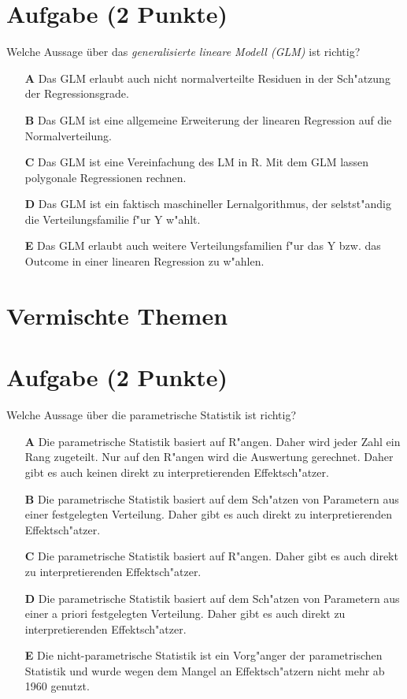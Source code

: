 \documentclass[a4paper, 9pt]{scrartcl}\usepackage[]{graphicx}\usepackage[]{xcolor}
\begin{document}
\section{Aufgabe \hfill (2 Punkte)}

Welche Aussage {\"u}ber das \textit{generalisierte lineare Modell (GLM)} ist richtig?  



\begin{enumerate}
\item [\textbf{A} \msquare] Das GLM erlaubt auch nicht normalverteilte Residuen in der Sch{"a}tzung der Regressionsgrade.
\item [\textbf{B} \msquare] Das GLM ist eine allgemeine Erweiterung der linearen Regression auf die Normalverteilung.
\item [\textbf{C} \msquare] Das GLM ist eine Vereinfachung des LM in R. Mit dem GLM lassen polygonale Regressionen rechnen.
\item [\textbf{D} \msquare] Das GLM ist ein faktisch maschineller Lernalgorithmus, der selstst{"a}ndig die Verteilungsfamilie f{"u}r Y w{"a}hlt.
\item [\textbf{E} \msquare] Das GLM erlaubt auch weitere Verteilungsfamilien f{"u}r das Y bzw. das Outcome in einer linearen Regression zu w{"a}hlen.
\end{enumerate}
\section*{Vermischte Themen}  

\section{Aufgabe \hfill (2 Punkte)}




Welche Aussage {\"u}ber die parametrische Statistik ist richtig?



\begin{enumerate}
\item [\textbf{A} \msquare] Die parametrische Statistik basiert auf R{"a}ngen. Daher wird jeder Zahl ein Rang zugeteilt. Nur auf den R{"a}ngen wird die Auswertung gerechnet. Daher gibt es auch keinen direkt zu interpretierenden Effektsch{"a}tzer.
\item [\textbf{B} \msquare] Die parametrische Statistik basiert auf dem Sch{"a}tzen von Parametern aus einer festgelegten Verteilung. Daher gibt es auch direkt zu interpretierenden Effektsch{"a}tzer.
\item [\textbf{C} \msquare] Die parametrische Statistik basiert auf R{"a}ngen. Daher gibt es auch direkt zu interpretierenden Effektsch{"a}tzer.
\item [\textbf{D} \msquare] Die parametrische Statistik basiert auf dem Sch{"a}tzen von Parametern aus einer a priori festgelegten Verteilung. Daher gibt es auch direkt zu interpretierenden Effektsch{"a}tzer.
\item [\textbf{E} \msquare] Die nicht-parametrische Statistik ist ein Vorg{"a}nger der parametrischen Statistik und wurde wegen dem Mangel an Effektsch{"a}tzern nicht mehr ab 1960 genutzt.
\end{enumerate}
\end{document}

